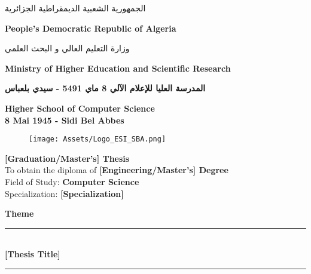 \begin{titlepage}

\centering
\begin{Arabic}
    {\normalsize \textsc{الجمهورية الشعبية الديمقراطية الجزائرية}} \\[1mm]
\end{Arabic}
{\normalsize \textbf{People's Democratic Republic of Algeria}} \\[1mm]

\begin{Arabic}
    {\normalsize \textsc{وزارة التعليم العالي و البحث العلمي}} \\[1mm]
\end{Arabic}
{\normalsize \textbf{Ministry of Higher Education and Scientific Research}}\\

\begin{Arabic}
    {\normalsize \textbf{المدرسة العليا للإعلام الآلي \hspace{0.3mm} 8 ماي 5491 - سيدي بلعباس}}\\[1mm]
\end{Arabic}
{\normalsize \textbf{Higher School of Computer Science \\[1mm] 8 Mai 1945 - Sidi Bel Abbes}}\\

\vspace{0.5cm}


\begin{figure}[ht]
    \centering
    \texttt{[image: Assets/Logo\_ESI\_SBA.png]}
\end{figure}

\vspace{0.3cm}

\Large \textbf{[Graduation/Master's] Thesis} \\
\vspace{0.4cm}
{\normalsize To obtain the diploma of \textbf{[Engineering/Master's] Degree}} \\
{\normalsize Field of Study: \textbf{Computer Science}} \\
{\normalsize Specialization: \textbf{[Specialization]}} \\
\vspace{0.4cm}

\Large \textbf{Theme}\\
\rule{15cm}{0.2mm}\\
\vspace{0.4cm}
\centering
{\textbf{[Thesis Title]}}\\
\rule{15cm}{0.2mm}\\
\vspace{0.2cm}


\end{titlepage}

